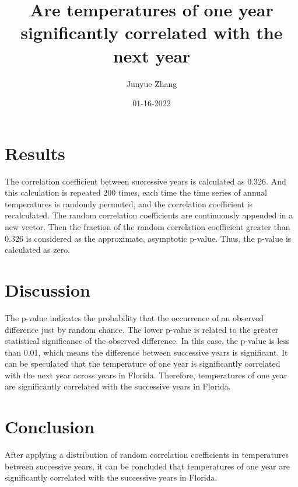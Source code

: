 \documentclass[10pt, a4paper]{article}
\title{Are temperatures of one year significantly correlated with the next year}
\author{Junyue Zhang}
\date{01-16-2022}
\begin{document}
  \maketitle
  
  \section{Results}
    The correlation coefficient between successive years is calculated as 0.326. And this calculation is repeated 200 times, each time the time series of annual temperatures is randomly permuted, and the correlation coefficient is recalculated. The random correlation coefficients are continuously appended in a new vector. Then the fraction of the random correlation coefficient greater than 0.326 is considered as the approximate, asymptotic p-value. 
    Thus, the p-value is calculated as zero.  
   
  \section{Discussion}
    The p-value indicates the probability that the occurrence of an observed difference just by random chance. The lower p-value is related to the greater statistical significance of the observed difference.
    In this case, the p-value is less than 0.01, which means the difference between successive years is significant.
    It can be speculated that the temperature of one year is significantly correlated with the next year across years in Florida.  
    Therefore, temperatures of one year are significantly correlated with the successive years in Florida.

  \section{Conclusion}
    After applying a distribution of random correlation coefficients in temperatures between successive years, it can be concluded that temperatures of one year are significantly correlated with the successive years in Florida.
\end{document}

